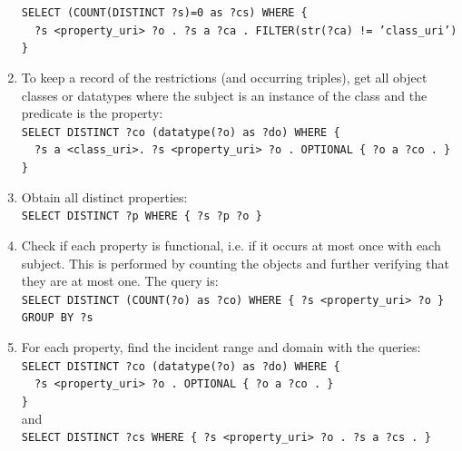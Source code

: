 \documentclass[review]{elsarticle}
\newcommand{\textttt}[1] {\texttt{\footnotesize#1}}
\newcommand{\h} {\hphantom ~ }
\begin{document}
\begin{enumerate}[leftmargin=0cm]
	\textttt{SELECT (COUNT(DISTINCT ?s)=0 as ?cs) WHERE \{\\
	\h ?s <property\_uri> ?o . ?s a ?ca . FILTER(str(?ca) != 'class\_uri')\\ \}}
\item To keep a record of the restrictions (and occurring triples), get all object classes or datatypes where the subject is an instance of the class and the predicate is the property:\\
	\textttt{SELECT DISTINCT ?co (datatype(?o) as ?do) WHERE \{\\
		\h ?s a <class\_uri>. ?s <property\_uri> ?o . OPTIONAL \{ ?o a ?co . \}\\
\}}
    \item Obtain all distinct properties:\\
        \textttt{SELECT DISTINCT ?p WHERE \{ ?s ?p ?o \}}
    \item Check if each property is functional, i.e. if it
        occurs at most once with each subject.
        This is performed by counting the objects and further verifying
        that they are at most one. The query is:\\
        \textttt{SELECT DISTINCT (COUNT(?o) as ?co) WHERE \{ ?s
            <property\_uri> ?o \} GROUP BY ?s}
    \item For each property, find the incident range and domain with the
        queries:\\
        \textttt{SELECT DISTINCT ?co (datatype(?o) as ?do) WHERE \{\\
			\h ?s <property\_uri> ?o . OPTIONAL \{ ?o a ?co . \}\\\}} \\
        and \\
        \textttt{SELECT DISTINCT ?cs WHERE \{ ?s <property\_uri> ?o . ?s a ?cs . \}}

\end{enumerate}
\end{document}
